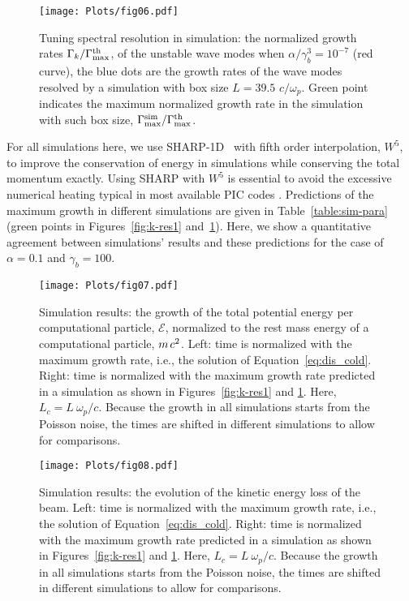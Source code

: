 \documentclass[pop,numberedappendix,iop]{aeb_emulateapj_2015}
\begin{document}
\begin{figure} 
\center
\texttt{[image: Plots/fig06.pdf]}
\caption{
Tuning spectral resolution in simulation: the normalized growth rates $\Gamma_k/\Gamma^{\rm th}_{\rm  max}$, of the unstable wave modes when $\alpha/\gamma_b^3=10^{-7}$ (red curve), the blue dots are the growth rates of the wave modes resolved by a simulation with box size $L = 39.5$ $c/\omega_p$.
Green point indicates the maximum normalized growth rate in the simulation with such box size, $\Gamma^{\rm sim}_{\rm max}/\Gamma^{\rm th}_{\rm  max}$. 
\label{fig:k-res2}
}
\end{figure} 



For all simulations here, we use SHARP-1D~\citep{sharp} with fifth order interpolation, $W^5$, to improve the conservation of energy in simulations while conserving the total momentum exactly.
Using SHARP with $W^5$ is essential to avoid the excessive numerical heating typical in most available PIC codes \citep[see][for illustration]{sharp}.
Predictions of the maximum growth in different simulations are given in Table~\ref{table:sim-para} (green points in Figures~\ref{fig:k-res1} and~\ref{fig:k-res2}).
Here, we show a quantitative agreement between simulations' results and these predictions for the case of $\alpha = 0.1$ and $\gamma_b=100$.



\begin{figure*}
\center
\texttt{[image: Plots/fig07.pdf]}
\caption{
Simulation results: the growth of the total potential energy per computational particle, $\mathcal{E}$, normalized to the rest mass energy of a computational particle,  $m \hspace{.05cm} c^2$. 
Left: time is normalized with the maximum growth rate, i.e., the solution of Equation~\eqref{eq:dis_cold}.
Right: time is normalized with the maximum growth rate predicted in a simulation as shown in Figures~\ref{fig:k-res1} and \ref{fig:k-res2}. Here, $L_c  = L ~ \omega_p/c$.
Because the growth in all simulations starts from the Poisson noise, the times are shifted in different simulations to allow for comparisons.
\label{fig:PE}}
\end{figure*}


\begin{figure*}
\center
\texttt{[image: Plots/fig08.pdf]}
\caption{
Simulation results: the evolution of the kinetic energy loss of the beam.
Left: time is normalized with the maximum growth rate, i.e., the solution of Equation~\eqref{eq:dis_cold}.
Right: time is normalized with the maximum growth rate predicted in a simulation as shown in Figures~\ref{fig:k-res1} and \ref{fig:k-res2}.
Here, $L_c  = L ~ \omega_p/c$.
Because the growth in all simulations starts from the Poisson noise, the times are shifted in different simulations to allow for comparisons.
\label{fig:KE}}
\end{figure*}
\end{document}
